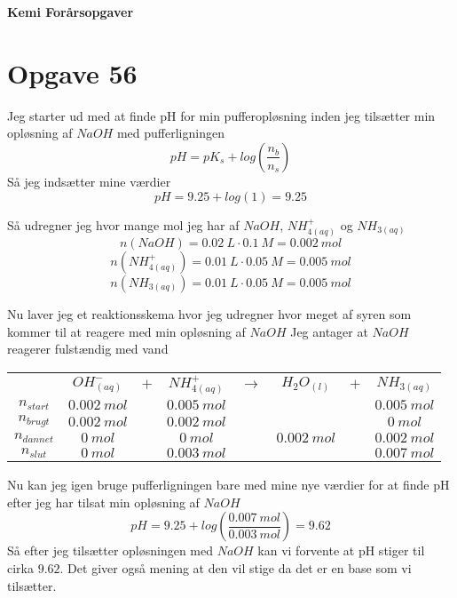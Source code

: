 \documentclass[12pt]{article}
\begin{document}
\Large{\textbf{Kemi Forårsopgaver}}
\normalsize

\section*{Opgave 56}
Jeg starter ud med at finde pH for min pufferopløsning inden jeg tilsætter min opløsning af $NaOH$ med pufferligningen
$$pH = pK_s + log(\frac{n_b}{n_s})$$
Så jeg indsætter mine værdier
$$pH = 9.25 + log(1) = 9.25$$

Så udregner jeg hvor mange mol jeg har af $NaOH$, $NH^+_{4(aq)}$ og $NH_{3(aq)}$
$$n(NaOH)=0.02 \ L \cdot 0.1 \ M = 0.002 \ mol$$
$$n(NH^+_{4(aq)})=0.01 \ L \cdot 0.05 \ M = 0.005 \ mol$$
$$n(NH_{3(aq)})=0.01 \ L \cdot 0.05 \ M = 0.005 \ mol$$

Nu laver jeg et reaktionsskema hvor jeg udregner hvor meget af syren som kommer til at reagere med min opløsning af $NaOH$
Jeg antager at $NaOH$ reagerer fulstændig med vand

\begin{center}
  \begin{tabular}{c c c c c c c c}

    & $OH^{-}_{(aq)}$ & $+$ & $NH_{4(aq)}^+$ & $\rightarrow$ & $H_2O_{(l)}$ & $+$ & $NH_{3(aq)}$\\
    $n_{start}$ & $0.002 \ mol$ && $0.005 \ mol$ &&&& $0.005 \ mol$\\
    $n_{brugt}$ & $0.002 \ mol$ && $0.002 \ mol$ &&&& $0 \ mol$\\
    $n_{dannet}$ & $0 \ mol$ && $0 \ mol$ && $0.002 \ mol$ && $0.002 \ mol$\\
    $n_{slut}$ & $0 \ mol$ && $0.003 \ mol$ &&&& $0.007 \ mol$

  \end{tabular}
\end{center}

Nu kan jeg igen bruge pufferligningen bare med mine nye værdier for at finde pH efter jeg har tilsat min opløsning af $NaOH$
$$pH = 9.25 + log(\frac{0.007 \ mol}{0.003 \ mol}) = 9.62$$
Så efter jeg tilsætter opløsningen med $NaOH$ kan vi forvente at pH stiger til cirka $9.62$.
Det giver også mening at den vil stige da det er en base som vi tilsætter.
\end{document}
